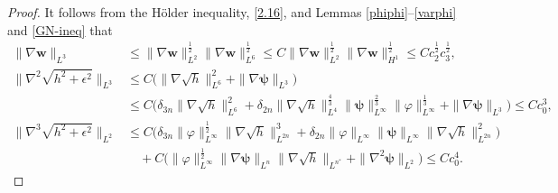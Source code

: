 \documentclass[11pt,reqno]{amsart}
\numberwithin{rk}{section}
\numberwithin{prop}{section}
\numberwithin{mydef}{section}
\numberwithin{lem}{section}
\numberwithin{equation}{section}
\numberwithin{thm}{section}
\begin{document}
\begin{proof}
It follows from the H\"older inequality, \eqref{2.16}, and Lemmas \ref{phiphi}--\ref{varphi} and \ref{GN-ineq} that 
\begin{equation}\label{hl2}
\begin{aligned}
\|\nabla \boldsymbol{w}\|_{L^3} &\leq  \|\nabla \boldsymbol{w}\|^{\frac{1}{2}}_{L^2}\|\nabla \boldsymbol{w}\|^{\frac{1}{2}}_{L^6} \leq  C\|\nabla \boldsymbol{w}\|^{\frac{1}{2}}_{L^2}\|\nabla \boldsymbol{w}\|^{\frac{1}{2}}_{H^1}\leq Cc_2^{\frac{1}{2}}c_3^{\frac{1}{2}},\\
\|\nabla^2\sqrt{h^2+\epsilon^2}\|_{L^3} &\leq   C\big(\|\nabla \sqrt{h}\|^2_{L^{6}}+\|\nabla \boldsymbol{\psi}\|_{L^3}\big)\\
&\leq C\big(\delta_{3n}\|\nabla \sqrt{h}\|^2_{L^{6}}\!+\delta_{2n}\|\nabla \sqrt{h}\|^{\frac{4}{3}}_{L^{4}}\|\boldsymbol{\psi}\|^{\frac{2}{3}}_{L^\infty} \|\varphi\|^{\frac{1}{3}}_{L^\infty}\!+\|\nabla \boldsymbol{\psi}\|_{L^3}\big)\leq Cc^3_0,\\
 \|\nabla^3\sqrt{h^2+\epsilon^2}\|_{L^2} 
&\leq C\big(\delta_{3n}\|\varphi\|^{\frac{1}{2}}_{L^\infty}\|\nabla \sqrt{h}\|^3_{L^{2n}}+
\delta_{2n}\|\varphi\|_{L^\infty}\|\boldsymbol{\psi}\|_{L^\infty}\|\nabla \sqrt{h}\|^2_{L^{2n}}\big)\\
&\quad +C\big(\|\varphi\|^{\frac{1}{2}}_{L^\infty}\|\nabla \boldsymbol{\psi}\|_{L^n}\|\nabla \sqrt{h}\|_{L^{n^*}}+\|\nabla^2 \boldsymbol{\psi}\|_{L^2}\big)\leq Cc^{4}_0. 
\end{aligned}
\end{equation}



\end{proof}
\end{document}
